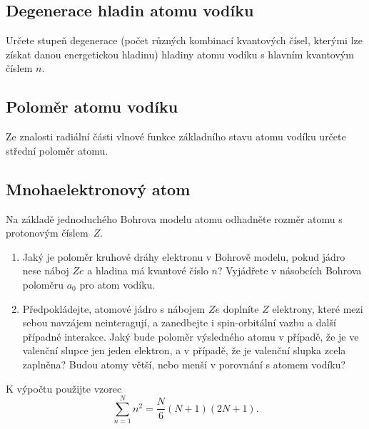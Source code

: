 \subsection{Degenerace hladin atomu vodíku}
    Určete stupeň degenerace (počet různých kombinací kvantových čísel, kterými lze získat danou energetickou hladinu) hladiny atomu vodíku s hlavním kvantovým číslem $n$.

\subsection{Poloměr atomu vodíku}
    Ze znalosti radiální části vlnové funkce základního stavu atomu vodíku určete střední poloměr atomu.

\subsection{Mnohaelektronový atom}
    Na základě jednoduchého Bohrova modelu atomu odhadněte rozměr atomu s protonovým číslem~$Z$.

    \begin{enumerate}
    \item
        Jaký je poloměr kruhové dráhy elektronu v Bohrově modelu, pokud jádro nese náboj $Ze$ a hladina má kvantové číslo $n$?
        Vyjádřete v násobcích Bohrova poloměru $a_{0}$ pro atom vodíku.

    \item
        Předpokládejte, atomové jádro s nábojem $Ze$ doplníte $Z$ elektrony, které mezi sebou navzájem neinteragují, a zanedbejte i spin-orbitální vazbu a další případné interakce.
        Jaký bude poloměr výsledného atomu v případě, že je ve valenční slupce jen jeden elektron, a v případě, že je valenční slupka zcela zaplněna?
        Budou atomy větší, nebo menší v porovnání s atomem vodíku?
    \end{enumerate}

    K výpočtu použijte vzorec
    \begin{equation}
        \sum_{n=1}^{N}n^{2}=\frac{N}{6}(N+1)(2N+1).
    \end{equation}
